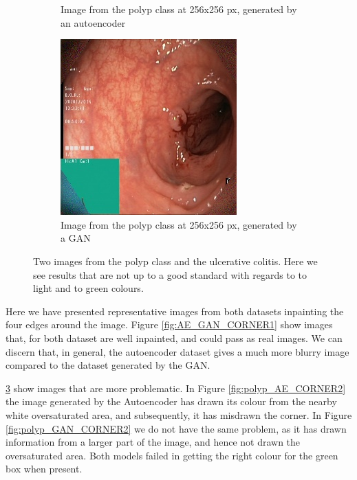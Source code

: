 \begin{figure}
\begin{subfigure}[t]{0.4\textwidth}
            \caption{Image from the polyp class at 256x256 px, generated by an autoencoder }   
            \label{fig:z_AE_CORNER2}
        \end{subfigure}
        \qquad%
        \begin{subfigure}[t]{0.4\textwidth}   
            \centering 
            \includegraphics[width=\textwidth]{experiments/figures/blackcorner/polypwithgreenGAN.jpg}
            \caption{Image from the polyp class at 256x256 px, generated by a GAN }   
            \label{fig:z_GAN_CORNER2}
        \end{subfigure}
        \caption{Two images from the polyp class and the ulcerative colitis. Here we see results that are not up to a good standard with regards to to light and to green colours.} 
        \label{fig:AE_GAN_CORNER2}
    \end{figure}
    
Here we have presented representative images from both datasets inpainting the four edges around the image. Figure \ref{fig:AE_GAN_CORNER1} show images that, for both dataset are well inpainted, and could pass as real images.
We can discern that, in general, the autoencoder dataset gives a much more blurry image compared to the dataset generated by the GAN.

\ref{fig:AE_GAN_CORNER2} show images that are more problematic. In Figure \ref{fig:polyp_AE_CORNER2} the image generated by the Autoencoder has drawn its colour from the nearby white oversaturated area, and subsequently, it has misdrawn the corner. In Figure \ref{fig:polyp_GAN_CORNER2} we do not have the same problem, as it has drawn information from a larger part of the image, and hence not drawn the oversaturated area.
Both models failed in getting the right colour for the green box when present.

